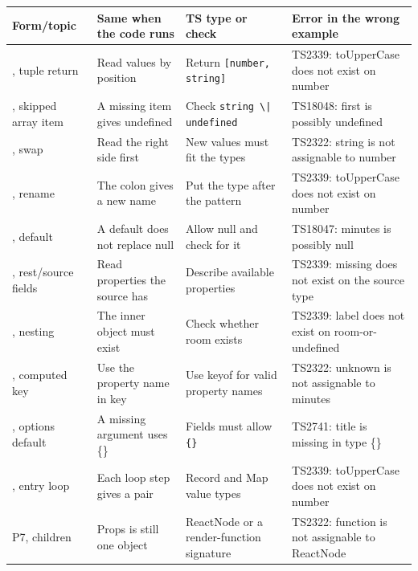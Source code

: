 \documentclass[
  10pt,
  a4paper,
]{article}
\newcounter{none} %
\begin{document}
{\def\LTcaptype{none} %
\begin{longtable}[]{@{}
  >{\raggedright\arraybackslash}p{}
  >{\raggedright\arraybackslash}p{}
  >{\raggedright\arraybackslash}p{}
  >{\raggedright\arraybackslash}p{}@{}}
\toprule\noalign{}
\begin{minipage}[b]{\linewidth}\raggedright
Form/topic
\end{minipage} & \begin{minipage}[b]{\linewidth}\raggedright
Same when the code runs
\end{minipage} & \begin{minipage}[b]{\linewidth}\raggedright
TS type or check
\end{minipage} & \begin{minipage}[b]{\linewidth}\raggedright
Error in the wrong example
\end{minipage} \\
\midrule\noalign{}
\endhead
\bottomrule\noalign{}
\endlastfoot
1, tuple return & Read values by position & Return
\texttt{[number, string]} & TS2339: toUpperCase does not exist on
number \\
2, skipped array item & A missing item gives undefined & Check
\texttt{string \textbackslash{}| undefined} & TS18048: first is possibly
undefined \\
3, swap & Read the right side first & New values must fit the types &
TS2322: string is not assignable to number \\
6, rename & The colon gives a new name & Put the type after the pattern
& TS2339: toUpperCase does not exist on number \\
7, default & A default does not replace null & Allow null and check for
it & TS18047: minutes is possibly null \\
8, rest/source fields & Read properties the source has & Describe
available properties & TS2339: missing does not exist on the source
type \\
9, nesting & The inner object must exist & Check whether room exists &
TS2339: label does not exist on room-or-undefined \\
10, computed key & Use the property name in key & Use keyof for valid
property names & TS2322: unknown is not assignable to minutes \\
11, options default & A missing argument uses \{\} & Fields must allow
\texttt{\{\}} & TS2741: title is missing in type \{\} \\
12, entry loop & Each loop step gives a pair & Record and Map value
types & TS2339: toUpperCase does not exist on number \\
P7, children & Props is still one object & ReactNode or a
render-function signature & TS2322: function is not assignable to
ReactNode \\
\end{longtable}
}
\end{document}
